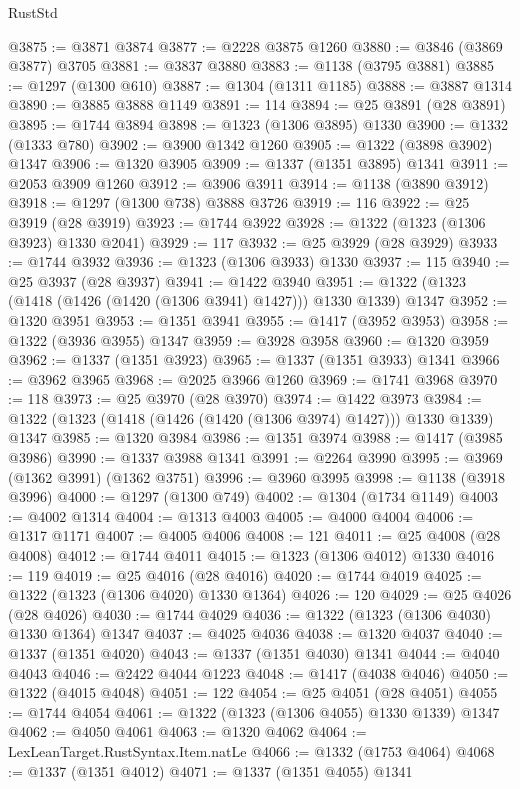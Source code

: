 \begin{lexlean}{RustStd}
\begin{coremodule}
{\begin{coremodule}
{{{{{{{{{{{{{{{{{{{{{{{{{{{{{{{{{{@3875 := @3871 @3874
@3877 := @2228 @3875 @1260
@3880 := @3846 (@3869 @3877) @3705
@3881 := @3837 @3880
@3883 := @1138 (@3795 @3881)
@3885 := @1297 (@1300 @610)
@3887 := @1304 (@1311 @1185)
@3888 := @3887 @1314
@3890 := @3885 @3888 @1149
@3891 := 114
@3894 := @25 @3891 (@28 @3891)
@3895 := @1744 @3894
@3898 := @1323 (@1306 @3895) @1330
@3900 := @1332 (@1333 @780)
@3902 := @3900 @1342 @1260
@3905 := @1322 (@3898 @3902) @1347
@3906 := @1320 @3905
@3909 := @1337 (@1351 @3895) @1341
@3911 := @2053 @3909 @1260
@3912 := @3906 @3911
@3914 := @1138 (@3890 @3912)
@3918 := @1297 (@1300 @738) @3888 @3726
@3919 := 116
@3922 := @25 @3919 (@28 @3919)
@3923 := @1744 @3922
@3928 := @1322 (@1323 (@1306 @3923) @1330 @2041)
@3929 := 117
@3932 := @25 @3929 (@28 @3929)
@3933 := @1744 @3932
@3936 := @1323 (@1306 @3933) @1330
@3937 := 115
@3940 := @25 @3937 (@28 @3937)
@3941 := @1422 @3940
@3951 := @1322 (@1323 (@1418 (@1426 (@1420 (@1306 @3941) @1427))) @1330 @1339) @1347
@3952 := @1320 @3951
@3953 := @1351 @3941
@3955 := @1417 (@3952 @3953)
@3958 := @1322 (@3936 @3955) @1347
@3959 := @3928 @3958
@3960 := @1320 @3959
@3962 := @1337 (@1351 @3923)
@3965 := @1337 (@1351 @3933) @1341
@3966 := @3962 @3965
@3968 := @2025 @3966 @1260
@3969 := @1741 @3968
@3970 := 118
@3973 := @25 @3970 (@28 @3970)
@3974 := @1422 @3973
@3984 := @1322 (@1323 (@1418 (@1426 (@1420 (@1306 @3974) @1427))) @1330 @1339) @1347
@3985 := @1320 @3984
@3986 := @1351 @3974
@3988 := @1417 (@3985 @3986)
@3990 := @1337 @3988 @1341
@3991 := @2264 @3990
@3995 := @3969 (@1362 @3991) (@1362 @3751)
@3996 := @3960 @3995
@3998 := @1138 (@3918 @3996)
@4000 := @1297 (@1300 @749)
@4002 := @1304 (@1734 @1149)
@4003 := @4002 @1314
@4004 := @1313 @4003
@4005 := @4000 @4004
@4006 := @1317 @1171
@4007 := @4005 @4006
@4008 := 121
@4011 := @25 @4008 (@28 @4008)
@4012 := @1744 @4011
@4015 := @1323 (@1306 @4012) @1330
@4016 := 119
@4019 := @25 @4016 (@28 @4016)
@4020 := @1744 @4019
@4025 := @1322 (@1323 (@1306 @4020) @1330 @1364)
@4026 := 120
@4029 := @25 @4026 (@28 @4026)
@4030 := @1744 @4029
@4036 := @1322 (@1323 (@1306 @4030) @1330 @1364) @1347
@4037 := @4025 @4036
@4038 := @1320 @4037
@4040 := @1337 (@1351 @4020)
@4043 := @1337 (@1351 @4030) @1341
@4044 := @4040 @4043
@4046 := @2422 @4044 @1223
@4048 := @1417 (@4038 @4046)
@4050 := @1322 (@4015 @4048)
@4051 := 122
@4054 := @25 @4051 (@28 @4051)
@4055 := @1744 @4054
@4061 := @1322 (@1323 (@1306 @4055) @1330 @1339) @1347
@4062 := @4050 @4061
@4063 := @1320 @4062
@4064 := LexLeanTarget.RustSyntax.Item.natLe
@4066 := @1332 (@1753 @4064)
@4068 := @1337 (@1351 @4012)
@4071 := @1337 (@1351 @4055) @1341
}}}}}}}}}}}}}}}}}}}}}}}}}}}}}}}}}}
\end{coremodule}}
\end{coremodule}
\end{lexlean}
